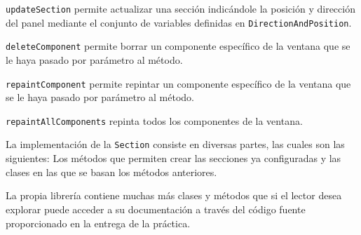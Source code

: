 \texttt{updateSection} permite actualizar una sección indicándole la posición y dirección del panel mediante el conjunto de variables definidas en \texttt{DirectionAndPosition}. \bigskip

\texttt{deleteComponent} permite borrar un componente específico de la ventana que se le haya pasado por parámetro al método.\bigskip

\texttt{repaintComponent} permite repintar un componente específico de la ventana que se le haya pasado por parámetro al método.\bigskip

\texttt{repaintAllComponents} repinta todos los componentes de la ventana.\bigskip

La implementación de la \texttt{Section} consiste en diversas partes, las cuales son las siguientes: Los métodos que permiten crear las secciones ya configuradas y las clases en las que se basan los métodos anteriores.\bigskip

La propia librería contiene muchas más clases y métodos que si el lector desea explorar puede acceder a su documentación a través del código fuente proporcionado en la entrega de la práctica.
